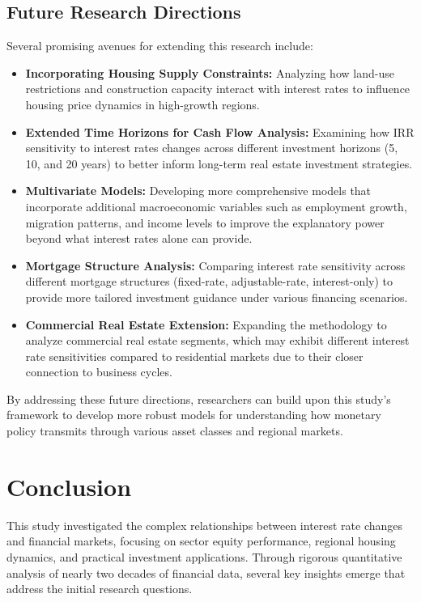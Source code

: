 \documentclass[12pt, stu, abstract]{apa7}
\begin{document}
\subsection{Future Research Directions}
Several promising avenues for extending this research include:

\begin{itemize}
\item \textbf{Incorporating Housing Supply Constraints:} Analyzing how land-use restrictions and construction capacity interact with interest rates to influence housing price dynamics in high-growth regions.

\item \textbf{Extended Time Horizons for Cash Flow Analysis:} Examining how IRR sensitivity to interest rates changes across different investment horizons (5, 10, and 20 years) to better inform long-term real estate investment strategies.

\item \textbf{Multivariate Models:} Developing more comprehensive models that incorporate additional macroeconomic variables such as employment growth, migration patterns, and income levels to improve the explanatory power beyond what interest rates alone can provide.

\item \textbf{Mortgage Structure Analysis:} Comparing interest rate sensitivity across different mortgage structures (fixed-rate, adjustable-rate, interest-only) to provide more tailored investment guidance under various financing scenarios.

\item \textbf{Commercial Real Estate Extension:} Expanding the methodology to analyze commercial real estate segments, which may exhibit different interest rate sensitivities compared to residential markets due to their closer connection to business cycles.
\end{itemize}

By addressing these future directions, researchers can build upon this study's framework to develop more robust models for understanding how monetary policy transmits through various asset classes and regional markets.

\section{Conclusion}
This study investigated the complex relationships between interest rate changes and financial markets, focusing on sector equity performance, regional housing dynamics, and practical investment applications. Through rigorous quantitative analysis of nearly two decades of financial data, several key insights emerge that address the initial research questions.
\end{document}
